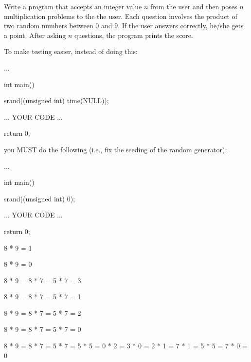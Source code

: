 Write a program that accepts an integer value $n$ from the user and then
poses $n$ multiplication problems to the the user. Each question involves the
product of two random numbers between $0$ and $9$. If the user answers
correctly, he/she gets a point. After asking $n$ questions, the
program prints the score.

To make testing easier, instead of doing this:
\begin{console}
...

int main()
{
    srand((unsigned int) time(NULL));

    ... YOUR CODE ...

    return 0;
}
\end{console}
you MUST do the following (i.e., fix the seeding of the random generator):
\begin{console}
...

int main()
{
    srand((unsigned int) 0);

    ... YOUR CODE ...

    return 0;
}
\end{console}

\resett
\nextt
\begin{console}[commandchars=\\\{\}]
8 * 9 = 
1
\end{console}

\nextt
\begin{console}[commandchars=\\\{\}]
8 * 9 = 
0
\end{console}

\nextt
\begin{console}[commandchars=\\\{\}]
8 * 9 = 
8 * 7 = 
5 * 7 = 
3
\end{console}

\nextt
\begin{console}[commandchars=\\\{\}]
8 * 9 = 
8 * 7 = 
5 * 7 = 
1
\end{console}

\nextt
\begin{console}[commandchars=\\\{\}]
8 * 9 = 
8 * 7 = 
5 * 7 = 
2
\end{console}

\nextt
\begin{console}[commandchars=\\\{\}]
8 * 9 = 
8 * 7 = 
5 * 7 = 
0
\end{console}

\nextt
\begin{console}[commandchars=\\\{\}]
8 * 9 = 
8 * 7 = 
5 * 7 = 
5 * 5 = 
0 * 2 = 
3 * 0 = 
2 * 1 = 
7 * 1 = 
5 * 5 = 
7 * 0 = 
0
\end{console}

